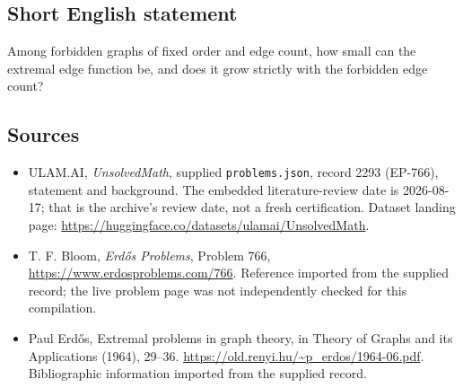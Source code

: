 \documentclass[11pt,a4paper]{article}
\begin{document}
\subsection{Short English statement}

Among forbidden graphs of fixed order and edge count, how small can the extremal edge function be, and does it grow strictly with the forbidden edge count?

\subsection{Sources}

{\small

\begin{itemize}

\item[\hypertarget{source:2293:1}{S1}] ULAM.AI, \emph{UnsolvedMath}, supplied \texttt{problems.json}, record 2293 (EP-766), statement and background. The embedded literature-review date is 2026-08-17; that is the archive’s review date, not a fresh certification. Dataset landing page: \url{https://huggingface.co/datasets/ulamai/UnsolvedMath}.

\item[\hypertarget{source:2293:2}{S2}] T. F. Bloom, \emph{Erdős Problems}, Problem 766, \url{https://www.erdosproblems.com/766}. Reference imported from the supplied record; the live problem page was not independently checked for this compilation.

\item[\hypertarget{source:2293:3}{S3}] Paul Erdős, Extremal problems in graph theory, in Theory of Graphs and its Applications (1964), 29--36. \url{https://old.renyi.hu/~p_erdos/1964-06.pdf}. Bibliographic information imported from the supplied record.

\end{itemize}

}

\label{end:2293}
\end{document}
